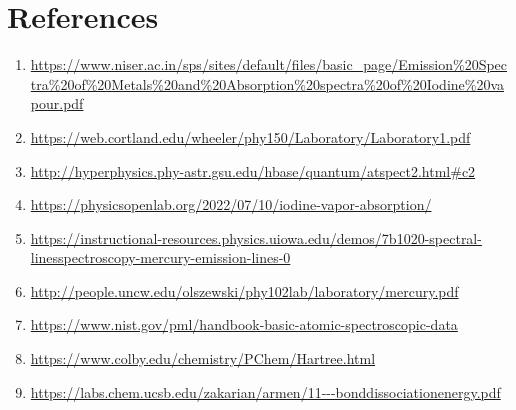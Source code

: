 \documentclass[a4paper, amsfonts, amssymb, amsmath, reprint, showkeys, nofootinbib, twoside]{revtex4-1}
\begin{document}
\section{References}
\begin{enumerate}
	\item{\url{https://www.niser.ac.in/sps/sites/default/files/basic_page/Emission%20Spectra%20of%20Metals%20and%20Absorption%20spectra%20of%20Iodine%20vapour.pdf}}
	\item{\url{https://web.cortland.edu/wheeler/phy150/Laboratory/Laboratory1.pdf}}
	\item{\url{http://hyperphysics.phy-astr.gsu.edu/hbase/quantum/atspect2.html#c2}}
	\item{\url{https://physicsopenlab.org/2022/07/10/iodine-vapor-absorption/}} 
	\item{\url{https://instructional-resources.physics.uiowa.edu/demos/7b1020-spectral-linesspectroscopy-mercury-emission-lines-0}}
	\item{\url{http://people.uncw.edu/olszewski/phy102lab/laboratory/mercury.pdf}}
	\item{\url{https://www.nist.gov/pml/handbook-basic-atomic-spectroscopic-data}}
	\item{\url{https://www.colby.edu/chemistry/PChem/Hartree.html}}
	\item{\url{https://labs.chem.ucsb.edu/zakarian/armen/11---bonddissociationenergy.pdf}}
\end{enumerate}
\end{document}
